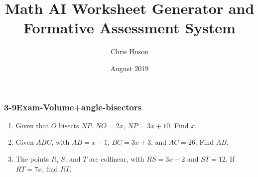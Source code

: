 \documentclass[12pt, twoside]{article}
\title{Math AI Worksheet Generator and Formative Assessment System}
\author{Chris Huson}
\date{August 2019}
\begin{document}
\subsubsection*{3-9Exam-Volume+angle-bisectors}
\begin{enumerate}
    \subsubsection*{Do Not Solve! \\
    Label the drawing completely and write an equation in terms of $x$ modeling the situation.}
    \vspace{0.5cm}
  
\item Given that $O$ bisects $\overline{NP}$. $NO=2x$, $NP=3x+10$. Find ${x}$. \vspace{1cm}
  \begin{flushright}
    \end{flushright} \vspace{2cm}
    
\item Given $\overline{ABC}$, with $AB=x-1$, $BC=3x+3$, and $AC=26$. Find ${AB}$. \vspace{1cm}
  \begin{flushright}
    \end{flushright} \vspace{2cm}
  
\item The points $R$, $S$, and $T$ are collinear, with $RS=3x-2$ and $ST=12$. If $RT=7x$, find ${RT}$. \vspace{1cm}
  \begin{flushright}
    \end{flushright} \vspace{2cm}
    

\end{enumerate}
\end{document}
